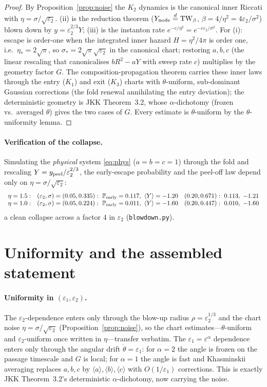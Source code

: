 \documentclass[11pt]{article}
\theoremstyle{remark}
\newcommand{\TW}{\mathrm{TW}}
\newcommand{\eqd}{\stackrel{d}{=}}
\newcommand{\ep}{\varepsilon}
\begin{document}
\begin{proof}
By Proposition~\ref{prop:noise} the $K_2$ dynamics is the canonical inner Riccati with
$\eta=\sigma/\sqrt{\ep_2}$. (ii) is the reduction theorem ($Y_{\rm node}\eqd\TW_\beta$,
$\beta=4/\eta^2=4\ep_2/\sigma^2$) blown down by $y=\ep_2^{2/3}Y$; (iii) is the instanton
rate $e^{-c/\eta^2}=e^{-c\ep_2/\sigma^2}$. For (i): escape is order-one when the integrated
inner hazard $H=\eta^2/4\pi$ is order one, i.e.\ $\eta_*=2\sqrt\pi$, so
$\sigma_*=2\sqrt\pi\sqrt{\ep_2}$ in the canonical chart; restoring $a,b,c$ (the linear
rescaling that canonicalises $bR^2-aY$ with sweep rate $c$) multiplies by the geometry
factor $G$. The composition-propagation theorem carries these inner laws through the entry
($K_1$) and exit ($K_3$) charts with $\theta$-uniform, sub-dominant Gaussian corrections
(the fold renewal annihilating the entry deviation); the deterministic geometry is JKK
Theorem~3.2, whose $\alpha$-dichotomy (frozen vs.\ averaged $\theta$) gives the two cases
of $G$. Every estimate is $\theta$-uniform by the $\theta$-uniformity lemma.
\end{proof}

\paragraph{Verification of the collapse.} Simulating the \emph{physical} system
\eqref{eq:phys} ($a=b=c=1$) through the fold and rescaling $Y=y_{\rm peel}/\ep_2^{2/3}$,
the early-escape probability and the peel-off law depend only on $\eta=\sigma/\sqrt{\ep_2}$:
\[
  \begin{array}{lll}
   \eta=1.5: & (\ep_2,\sigma)=(0.05,0.335):\ \mathbb P_{\rm early}=0.117,\ \langle Y\rangle=-1.20 & (0.20,0.671):\ 0.113,\ -1.21\\
   \eta=1.0: & (\ep_2,\sigma)=(0.05,0.224):\ \mathbb P_{\rm early}=0.011,\ \langle Y\rangle=-1.60 & (0.20,0.447):\ 0.010,\ -1.60
  \end{array}
\]
a clean collapse across a factor $4$ in $\ep_2$ (\texttt{blowdown.py}).

\section{Uniformity and the assembled statement}

\paragraph{Uniformity in $(\ep_1,\ep_2)$.} The $\ep_2$-dependence enters only through the
blow-up radius $\rho=\ep_2^{1/3}$ and the chart noise $\eta=\sigma/\sqrt{\ep_2}$
(Proposition~\ref{prop:noise}), so the chart estimates---$\theta$-uniform and
$\ep_2$-uniform once written in $\eta$---transfer verbatim. The $\ep_1=\ep^\alpha$
dependence enters only through the angular drift $\dot\theta=\ep_1$: for $\alpha=2$ the
angle is frozen on the passage timescale and $G$ is local; for $\alpha=1$ the angle is
fast and Khasminskii averaging replaces $a,b,c$ by $\langle a\rangle,\langle
b\rangle,\langle c\rangle$ with $O(1/\ep_1)$ corrections. This is exactly JKK Theorem~3.2's
deterministic $\alpha$-dichotomy, now carrying the noise.
\end{document}
